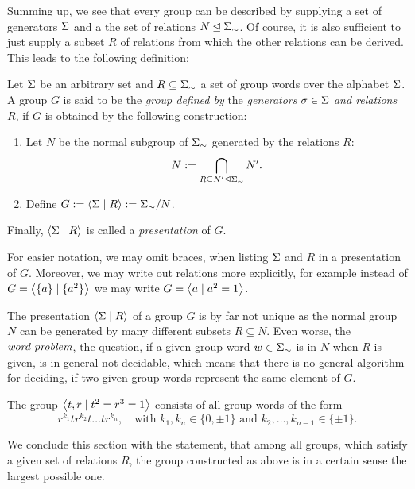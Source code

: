 Summing up, we see that every group can be described by supplying a set of generators $\Sigma$ and a the set of relations $N \unlhd {\Sigma}_{\sim}$. Of course, it is also sufficient to just supply a subset $R$ of relations from which the other relations can be derived. This leads to the following definition:

\begin{definition}
\label{dfn_GrpConstructGenRel}
Let $\Sigma$ be an arbitrary set and $R \subseteq {\Sigma}_{\sim}$ a set of group words over the alphabet $\Sigma$. A group $G$ is said to be the \emph{group defined by} the \emph{generators} $\sigma \in \Sigma$ \emph{and relations} $R$, if $G$ is obtained by the following construction:
\begin{enumerate}
\item Let $N$ be the normal subgroup of ${\Sigma}_{\sim}$ generated by the relations $R$:
\begin{equation*}
N := \bigcap_{R \subseteq N^{\prime} \unlhd {\Sigma}_{\sim}} N^{\prime}.
\end{equation*}
\item Define $G := \left\langle \Sigma \mid R \right\rangle := {\Sigma}_{\sim}/N$.
\end{enumerate}
Finally, $\left\langle \Sigma \mid R \right\rangle$ is called a \emph{presentation} of $G$.

For easier notation, we may omit braces, when listing $\Sigma$ and $R$ in a presentation of $G$. Moreover, we may write out relations more explicitly, for example instead of $G = \left\langle \{a\} \mid \{a^2\} \right\rangle$ we may write $G = \left\langle a \mid a^2 = 1 \right\rangle$.
\end{definition}

\begin{remark}
The presentation $\left\langle \Sigma \mid R \right\rangle$ of a group $G$ is by far not unique as the normal group $N$ can be generated by many different subsets $R \subseteq N$. Even worse, the $\emph{word problem}$, \ie the question, if a given group word $w \in {\Sigma}_{\sim}$ is in $N$ when $R$ is given, is in general not decidable, which means that there is no general algorithm for deciding, if two given group words represent the same element of $G$.
\end{remark}

\begin{example}
The group $\left\langle t,r \mid t^2 = r^3 = 1 \right\rangle$ consists of all group words of the form
\begin{equation*}
\label{ex_RTGroup}
r^{k_1} t r^{k_2} t \dots t r^{k_n}, \quad 
\text {with } k_1, k_n \in \{0,\pm 1\} \text{ and } k_2, \dots, k_{n-1} \in \{\pm 1\}.
\end{equation*}
\end{example}
We conclude this section with the statement, that among all groups, which satisfy a given set of relations $R$, the group constructed as above is in a certain sense the largest possible one.

